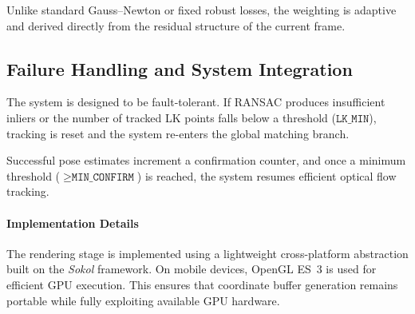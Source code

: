 Unlike standard Gauss--Newton or fixed robust losses, the weighting is adaptive and derived directly from the residual structure of the current frame.

\subsection{Failure Handling and System Integration}

The system is designed to be fault-tolerant. If RANSAC produces insufficient inliers or the number of tracked LK points falls below a threshold ($\texttt{LK\_MIN}$), tracking is reset and the system re-enters the global matching branch.

Successful pose estimates increment a confirmation counter, and once a minimum threshold ($\geq \texttt{MIN\_CONFIRM}$) is reached, the system resumes efficient optical flow tracking.

\paragraph{Implementation Details}

The rendering stage is implemented using a lightweight cross-platform abstraction built on the \textit{Sokol} framework. On mobile devices, OpenGL ES~3 is used for efficient GPU execution. This ensures that coordinate buffer generation remains portable while fully exploiting available GPU hardware.